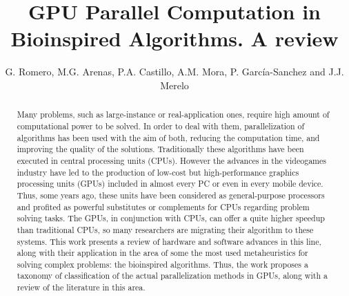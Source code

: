 \documentclass{comjnl}
\begin{document}

\title{GPU Parallel Computation in Bioinspired Algorithms. A review}


\author{G. Romero, M.G. Arenas, P.A. Castillo, A.M. Mora, P. García-Sanchez and J.J. Merelo}




\begin{abstract}

Many problems, such as large-instance or real-application ones, require high amount of computational power to be solved. In order to deal with them, parallelization of algorithms has been used with the aim of both, reducing the computation time, and improving the quality of the solutions. Traditionally these algorithms have been executed in central processing units (CPUs). However the advances in the videogames industry have led to the production of low-cost but high-performance graphics processing units (GPUs) included in almost every PC or even in every mobile device. Thus, some years ago, these units have been considered as general-purpose processors and profited as powerful substitutes or complements for CPUs regarding problem solving tasks.
The GPUs, in conjunction with CPUs, can offer a quite higher speedup than traditional CPUs, so many researchers are migrating their algorithm to these systems. 
This work presents a review of hardware and software advances in this line, along with their application in the area of some the most used metaheuristics for solving complex problems: the bioinspired algorithms. 
Thus, the work proposes a taxonomy of classification of the actual parallelization methods in GPUs, along with a review of the literature in this area.
\end{abstract}
\end{document}
